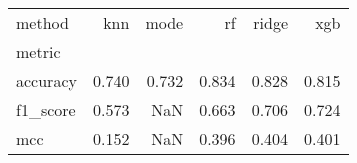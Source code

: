 \begin{tabular}{lrrrrr}
\toprule
method & knn & mode & rf & ridge & xgb \\
metric &  &  &  &  &  \\
\midrule
accuracy & 0.740 & 0.732 & 0.834 & 0.828 & 0.815 \\
f1_score & 0.573 & NaN & 0.663 & 0.706 & 0.724 \\
mcc & 0.152 & NaN & 0.396 & 0.404 & 0.401 \\
\bottomrule
\end{tabular}
